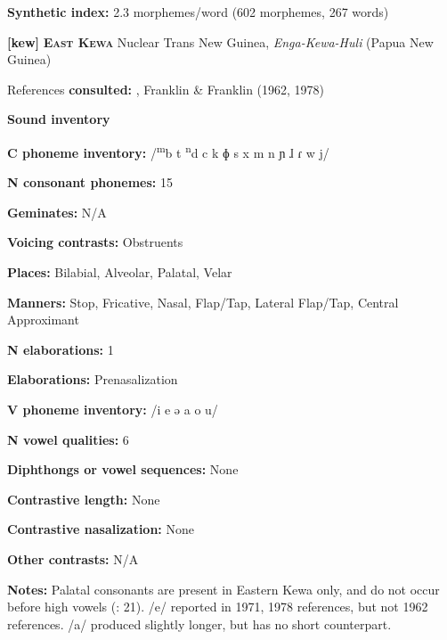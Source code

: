 \textbf{Synthetic index:} 2.3 morphemes/word (602 morphemes, 267 words)



\textbf{[kew]}   \textbf{\textsc{East Kewa}}  Nuclear Trans New Guinea, \textit{Enga-Kewa-Huli} (Papua New Guinea)



References \textbf{consulted:} \citet{Franklin1971}, Franklin \& Franklin (1962, 1978)



\textbf{Sound inventory}



\textbf{C phoneme inventory:} /\textsuperscript{m}b t \textsuperscript{n}d c k ɸ s x m n ɲ ɺ ɾ w j/



\textbf{N consonant phonemes:} 15



\textbf{Geminates:} N/A



\textbf{Voicing contrasts:} Obstruents



\textbf{Places:} Bilabial, Alveolar, Palatal, Velar



\textbf{Manners:} Stop, Fricative, Nasal, Flap/Tap, Lateral Flap/Tap, Central Approximant



\textbf{N elaborations:} 1



\textbf{Elaborations:} Prenasalization



\textbf{V phoneme inventory:} /i e ə a o u/



\textbf{N vowel qualities:} 6



\textbf{Diphthongs or vowel sequences:} None



\textbf{Contrastive length:} None



\textbf{Contrastive nasalization:} None



\textbf{Other contrasts:} N/A



\textbf{Notes:} Palatal consonants are present in Eastern Kewa only, and do not occur before high vowels (\citealt{FranklinFranklin1978}: 21). /e/ reported in 1971, 1978 references, but not 1962 references. /a/ produced slightly longer, but has no short counterpart.



